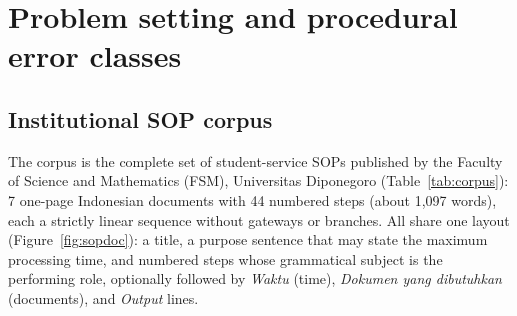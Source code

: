 \documentclass[a4paper,fleqn]{cas-sc}
\begin{document}
\section{Problem setting and procedural error classes}
\label{sec:problem}

\subsection{Institutional SOP corpus}
The corpus is the complete set of student-service SOPs published by the Faculty of Science and Mathematics (FSM), Universitas Diponegoro (Table~\ref{tab:corpus}): 7 one-page Indonesian documents with 44 numbered steps (about 1,097 words), each a strictly linear sequence without gateways or branches. All share one layout (Figure~\ref{fig:sopdoc}): a title, a purpose sentence that may state the maximum processing time, and numbered steps whose grammatical subject is the performing role, optionally followed by \emph{Waktu} (time), \emph{Dokumen yang dibutuhkan} (documents), and \emph{Output} lines.

\begin{table}[!htbp]
\centering
\caption{Characteristics of the 7 FSM Universitas Diponegoro SOP documents. ``PDF steps'' denotes numbered steps in official source documents; ``Graph steps'' denotes nodes in the curated workflow graph.}
\label{tab:corpus}
\small
\setlength{\tabcolsep}{4pt}
\end{table}
\end{document}
